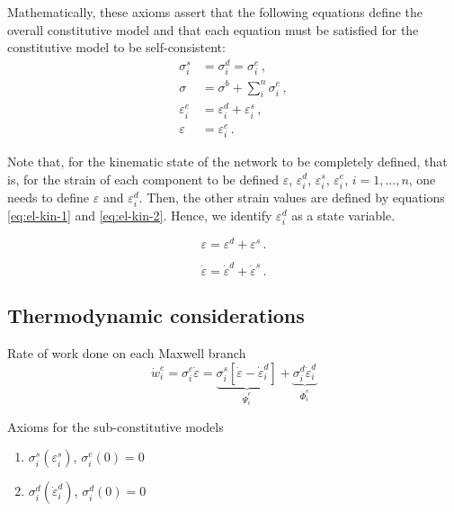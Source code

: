 \documentclass[12pt]{article}
\begin{document}
Mathematically, these axioms assert that the following equations define the overall constitutive model and that each equation must be satisfied for the constitutive model to be self-consistent:
\begin{align}
	\sigma^{s}_{i} &= \sigma^{d}_{i} = \sigma^{e}_{i}\,,\\
	\sigma & = \sigma^{b} + \sum_{i}^{n}\sigma^{e}_{i}\,,\\
	\varepsilon^{e}_{i} &= \varepsilon^{d}_{i} + \varepsilon^{s}_{i}\,,\label{eq:el-kin-1}\\
	\varepsilon& = \varepsilon^{e}_{i}\,.\label{eq:el-kin-2}
\end{align}

Note that, for the kinematic state of the network to be completely defined, that is, for the strain of each component to be defined $\varepsilon$, $\varepsilon^{d}_{i}$, $\varepsilon^{s}_{i}$, $\varepsilon^{e}_{i}$, $i=1,...,n$, one needs to define $\varepsilon$ and $\varepsilon^{d}_{i}$. Then, the other strain values are defined by equations \eqref{eq:el-kin-1} and \eqref{eq:el-kin-2}. Hence, we identify $\varepsilon^{d}_{i}$ as a state variable. 

\begin{equation}
		\varepsilon = \varepsilon^{d} + \varepsilon^{s}\,.
\end{equation}

\begin{equation}
	\dot{\varepsilon } = \dot{\varepsilon}^{d} + \dot{\varepsilon}^{s}\,.
\end{equation}

\subsection{Thermodynamic considerations}


Rate of work done on each Maxwell branch
\begin{equation}
	\dot{w}^{e}_{i} = \sigma^{e}_{i}\dot{\varepsilon} = \underbrace{\sigma^{s}_{i}\left[\dot{\varepsilon}-\dot{\varepsilon}_{i}^{d}\right]}_{\dot{\Psi}^{e}_{i}} + \underbrace{\sigma^{d}_{i}\dot{\varepsilon}_{i}^{d}}_{\dot{\Phi}^{e}_{i}}
\end{equation}

Axioms for the sub-constitutive models
\begin{enumerate}
	\item $\sigma^{s}_{i}(\varepsilon^{s}_{i})$, $\sigma^{e}_{i}(0) = 0$
	\item $\sigma^{d}_{i}\left(\dot{\varepsilon}^{d}_{i}\right)$,  $\sigma^{d}_{i}\left(0\right) = 0$ 
\end{enumerate}
\end{document}
